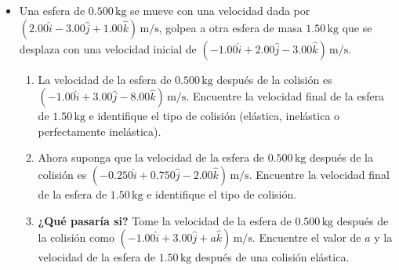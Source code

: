 \documentclass[11pt,a4paper]{article}
\begin{document}
\begin{itemize}
    \item[\textbf{47.}] Una esfera de \(0.500\,\text{kg}\) se mueve con una velocidad dada por \((2.00\hat{i} - 3.00\hat{j} + 1.00\hat{k})\,\text{m/s}\), golpea a otra esfera de masa \(1.50\,\text{kg}\) que se desplaza con una velocidad inicial de \((-1.00\hat{i} + 2.00\hat{j} - 3.00\hat{k})\,\text{m/s}\).
    \begin{enumerate}
        \item La velocidad de la esfera de \(0.500\,\text{kg}\) después de la colisión es \((-1.00\hat{i} + 3.00\hat{j} - 8.00\hat{k})\,\text{m/s}\). Encuentre la velocidad final de la esfera de \(1.50\,\text{kg}\) e identifique el tipo de colisión (elástica, inelástica o perfectamente inelástica).
        \item Ahora suponga que la velocidad de la esfera de \(0.500\,\text{kg}\) después de la colisión es \((-0.250\hat{i} + 0.750\hat{j} - 2.00\hat{k})\,\text{m/s}\). Encuentre la velocidad final de la esfera de \(1.50\,\text{kg}\) e identifique el tipo de colisión.
        \item \textbf{¿Qué pasaría si?} Tome la velocidad de la esfera de \(0.500\,\text{kg}\) después de la colisión como \((-1.00\hat{i} + 3.00\hat{j} + a\hat{k})\,\text{m/s}\). Encuentre el valor de \(a\) y la velocidad de la esfera de \(1.50\,\text{kg}\) después de una colisión elástica.
    \end{enumerate}
    \vspace*{7cm}


\end{itemize}
\end{document}
